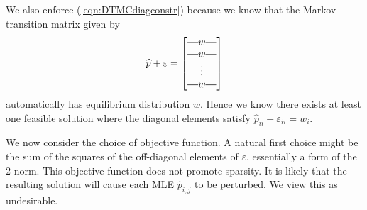 \documentclass[review,letterpaper,11pt]{elsarticle}
\newcommand*{\horzbar}{\rule[.5ex]{2.5ex}{0.5pt}}
\begin{document}
We also enforce (\ref{eqn:DTMCdiagconstr}) because we know that the Markov transition matrix given by
\begin{equation}
\label{eqn:dtmcguarantee}
\widehat{p} + \varepsilon = 
\begin{bmatrix} \horzbar w \horzbar \\
\horzbar w \horzbar \\
\vdots \\
\horzbar w \horzbar
\end{bmatrix}
\end{equation}
automatically has equilibrium distribution $w$.  Hence we know there exists at least one feasible solution where the diagonal elements satisfy $\widehat{p}_{ii} + \varepsilon_{ii} = w_i$.

We now consider the choice of objective function.  A natural first choice might be the sum of the squares of the off-diagonal elements of $\varepsilon$, essentially a form of the $2$-norm.  This objective function does not promote sparsity.  It is likely that the resulting solution will cause each MLE $\widehat{p}_{i,j}$ to be perturbed.  We view this as undesirable.
\end{document}

